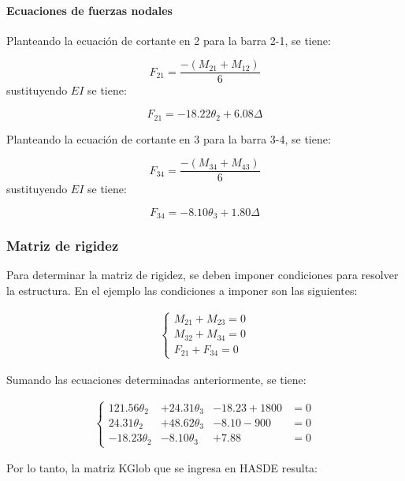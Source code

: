 \paragraph{Ecuaciones de fuerzas nodales}

Planteando la ecuación de cortante en 2 para la barra 2-1, se tiene:

$$
F_{21} = \frac{-(M_{21}+M_{12})}{6}
$$
sustituyendo $EI$ se tiene:

\begin{equation}
\boxed{
	F_{21} = -18.22 \theta_2 + 6.08 \Delta
}
\end{equation}

Planteando la ecuación de cortante en 3 para la barra 3-4, se tiene:

$$
F_{34} = \frac{-(M_{34}+M_{43})}{6}
$$
sustituyendo $EI$ se tiene:

\begin{equation}
\boxed{
	F_{34} = -8.10 \theta_3 + 1.80 \Delta
}
\end{equation}

\subsubsection{Matriz de rigidez}

Para determinar la matriz de rigidez, se deben imponer condiciones para resolver la estructura. En el ejemplo las condiciones a imponer son las siguientes:


\begin{eqnarray}
	\left\lbrace 
	\begin{array}{l}
	M_{21}+M_{23} = 0 \\
	M_{32}+M_{34} = 0 \\
	F_{21}+F_{34} = 0
	\end{array}
	\right.
\end{eqnarray}

Sumando las ecuaciones determinadas anteriormente, se tiene:

\begin{eqnarray}
	\left\lbrace 
	\begin{array}{llll}
	121.56 \theta_{2} &+ 24.31 \theta_{3} &-18.23 +1800 &= 0\\
	24.31 \theta_{2} &+ 48.62 \theta_{3} &-8.10 -900  &= 0\\
	-18.23 \theta_{2} &-8.10 \theta_{3} &+7.88 &= 0
	\end{array}
	\right.
\end{eqnarray}

Por lo tanto, la matriz KGlob que se ingresa en HASDE resulta:

